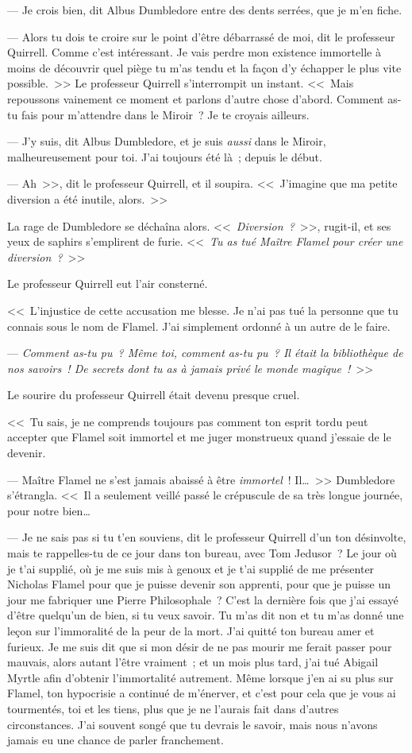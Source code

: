 --- Je crois bien, dit Albus Dumbledore entre des dents serrées, que je m'en fiche.

--- Alors tu dois te croire sur le point d'être débarrassé de moi, dit le professeur Quirrell. Comme c'est intéressant. Je vais perdre mon existence immortelle à moins de découvrir quel piège tu m'as tendu et la façon d'y échapper le plus vite possible.~>> Le professeur Quirrell s'interrompit un instant. <<~Mais repoussons vainement ce moment et parlons d'autre chose d'abord. Comment as-tu fais pour m'attendre dans le Miroir~? Je te croyais ailleurs.

--- J'y suis, dit Albus Dumbledore, et je suis \emph{aussi} dans le Miroir, malheureusement pour toi. J'ai toujours été là~; depuis le début.

--- Ah~>>, dit le professeur Quirrell, et il soupira. <<~J'imagine que ma petite diversion a été inutile, alors.~>>

La rage de Dumbledore se déchaîna alors. <<~\emph{Diversion~?}~>>, rugit-il, et ses yeux de saphirs s'emplirent de furie. <<~\emph{Tu as tué Maître Flamel pour créer une diversion~?}~>>

Le professeur Quirrell eut l'air consterné.

<<~L'injustice de cette accusation me blesse. Je n'ai pas tué la personne que tu connais sous le nom de Flamel. J'ai simplement ordonné à un autre de le faire.

--- \emph{Comment as-tu pu~? Même toi, comment as-tu pu~? Il était la bibliothèque de nos savoirs~! De secrets dont tu as à jamais privé le monde magique~!}~>>

Le sourire du professeur Quirrell était devenu presque cruel.

<<~Tu sais, je ne comprends toujours pas comment ton esprit tordu peut accepter que Flamel soit immortel et me juger monstrueux quand j'essaie de le devenir.

--- Maître Flamel ne s'est jamais abaissé à être \emph{immortel}~! Il…~>> Dumbledore s'étrangla. <<~Il a seulement veillé passé le crépuscule de sa très longue journée, pour notre bien…

--- Je ne sais pas si tu t'en souviens, dit le professeur Quirrell d'un ton désinvolte, mais te rappelles-tu de ce jour dans ton bureau, avec Tom Jedusor~? Le jour où je t'ai supplié, où je me suis mis à genoux et je t'ai supplié de me présenter Nicholas Flamel pour que je puisse devenir son apprenti, pour que je puisse un jour me fabriquer une Pierre Philosophale~? C'est la dernière fois que j'ai essayé d'être quelqu'un de bien, si tu veux savoir. Tu m'as dit non et tu m'as donné une leçon sur l'immoralité de la peur de la mort. J'ai quitté ton bureau amer et furieux. Je me suis dit que si mon désir de ne pas mourir me ferait passer pour mauvais, alors autant l'être vraiment~; et un mois plus tard, j'ai tué Abigail Myrtle afin d'obtenir l'immortalité autrement. Même lorsque j'en ai su plus sur Flamel, ton hypocrisie a continué de m'énerver, et c'est pour cela que je vous ai tourmentés, toi et les tiens, plus que je ne l'aurais fait dans d'autres circonstances. J'ai souvent songé que tu devrais le savoir, mais nous n'avons jamais eu une chance de parler franchement.

